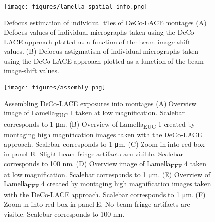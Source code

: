 \documentclass[
]{article}
\newenvironment{fignos:tagged-figure}[1][]{
    \let\oldthefigure\thefigure
    \let\oldtheHfigure\theHfigure
    \renewcommand{\thefigure}{#1}
    \renewcommand{\theHfigure}{#1}
  }{
    \let\thefigure\oldthefigure
    \let\theHfigure\oldtheHfigure
    \addtocounter{figure}{-1}
  }
\providecommand{\DIFaddbegin}{} %
\providecommand{\DIFaddend}{} %
\providecommand{\DIFdelbegin}{} %
\providecommand{\DIFdelend}{} %
\newcommand{\DIFscaledelfig}{0.5}
\newlength{\DIFdelgraphicswidth} %
\newlength{\DIFdelgraphicsheight} %
\newcommand{\DIFaddincludegraphics}[2][]{{\color{blue}\fbox{\DIFOincludegraphics[#1]{#2}}}} %
\newcommand{\DIFdelincludegraphics}[2][]{%
\sbox{\DIFdelgraphicsbox}{\DIFOincludegraphics[#1]{#2}}%
\settoboxwidth{\DIFdelgraphicswidth}{\DIFdelgraphicsbox} %
\settoboxtotalheight{\DIFdelgraphicsheight}{\DIFdelgraphicsbox} %
\scalebox{\DIFscaledelfig}{%
\parbox[b]{\DIFdelgraphicswidth}{\usebox{\DIFdelgraphicsbox}\\[-\baselineskip] \rule{\DIFdelgraphicswidth}{0em}}\llap{\resizebox{\DIFdelgraphicswidth}{\DIFdelgraphicsheight}{%
\setlength{\unitlength}{\DIFdelgraphicswidth}%
\begin{picture}(1,1)%
\thicklines\linethickness{2pt} %
{\color[rgb]{1,0,0}\put(0,0){\framebox(1,1){}}}%
{\color[rgb]{1,0,0}\put(0,0){\line( 1,1){1}}}%
{\color[rgb]{1,0,0}\put(0,1){\line(1,-1){1}}}%
\end{picture}%
}\hspace*{3pt}}} %
} %
\DeclareRobustCommand{\DIFaddbegin}{\DIFOaddbegin \let\includegraphics\DIFaddincludegraphics} %
\DeclareRobustCommand{\DIFaddend}{\DIFOaddend \let\includegraphics\DIFOincludegraphics} %
\DeclareRobustCommand{\DIFdelbegin}{\DIFOdelbegin \let\includegraphics\DIFdelincludegraphics} %
\DeclareRobustCommand{\DIFdelend}{\DIFOaddend \let\includegraphics\DIFOincludegraphics} %
\begin{document}
\DIFdelbegin %
\DIFdelend \DIFaddbegin \begin{fignos:tagged-figure}
\DIFaddend 

\begin{figure}
\hypertarget{fig:lamella_spatial_info}{%
\centering
\texttt{[image: figures/lamella\_spatial\_info.png]}
\caption{Defocus estimation of individual tiles of DeCo-LACE montages (A)
Defocus values of individual micrographs taken using the DeCo-LACE
approach plotted as a function of the beam image-shift values. (B)
Defocus astigmatism of individual micrographs taken using the DeCo-LACE
approach plotted as a function of the beam image-shift
values.}\label{fig:lamella_spatial_info}
}
\end{figure}

\end{fignos:tagged-figure}

\begin{figure}
\hypertarget{fig:assembly}{%
\centering
\texttt{[image: figures/assembly.png]}
\caption{Assembling DeCo-LACE exposures into montages (A) Overview image of
Lamella\textsubscript{EUC} 1 taken at low magnification. Scalebar corresponds to 1 μm.
(B) Overview of Lamella\textsubscript{EUC} 1 created by montaging high magnification
images taken with the DeCo-LACE approach. Scalebar corresponds to 1 μm.
(C) Zoom-in into red box in panel B. Slight beam-fringe artifacts are
visible. Scalebar corresponds to 100 nm. (D) Overview image of
Lamella\textsubscript{FFF} 4 taken at low magnification. Scalebar corresponds to 1 μm.
(E) Overview of Lamella\textsubscript{FFF} 4 created by montaging high magnification
images taken with the DeCo-LACE approach. Scalebar corresponds to 1 μm.
(F) Zoom-in into red box in panel E. No beam-fringe artifacts are
visible. Scalebar corresponds to 100
nm.}\label{fig:assembly}
}
\end{figure}
\end{document}
